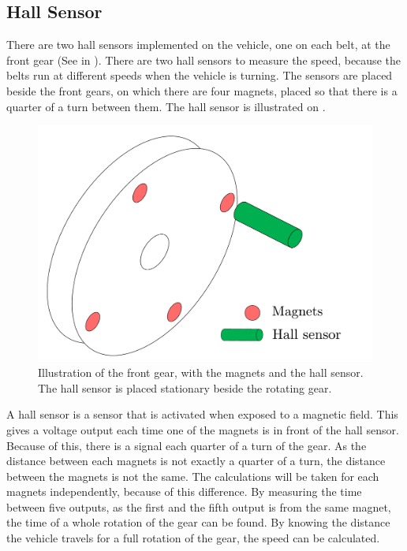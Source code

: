 \subsection{Hall Sensor}
There are two hall sensors implemented on the vehicle, one on each belt, at the front gear (See  in ). There are two hall sensors to measure the speed, because the belts run at different speeds when the vehicle is turning. The sensors are placed beside the front gears, on which there are four magnets, placed so that there is a quarter of a turn between them. The hall sensor is illustrated on .

 \begin{figure}[H]
	\centering
	\includegraphics[scale=0.4]{figures/HallSensor3D.pdf}
	\caption{Illustration of the front gear, with the magnets and the hall sensor. The hall sensor is placed stationary beside the rotating gear.}
	\label{HallSensor}
\end{figure}

A hall sensor is a sensor that is activated when exposed to a magnetic field. This gives a voltage output each time one of the magnets is in front of the hall sensor. Because of this, there is a signal each quarter of a turn of the gear. As the distance between each magnets is not exactly a quarter of a turn, the distance between the magnets is not the same. The calculations will be taken for each magnets independently, because of this difference.
By measuring the time between five outputs, as the first and the fifth output is from the same magnet, the time of a whole rotation of the gear can be found. By knowing the distance the vehicle travels for a full rotation of the gear, the speed can be calculated.


